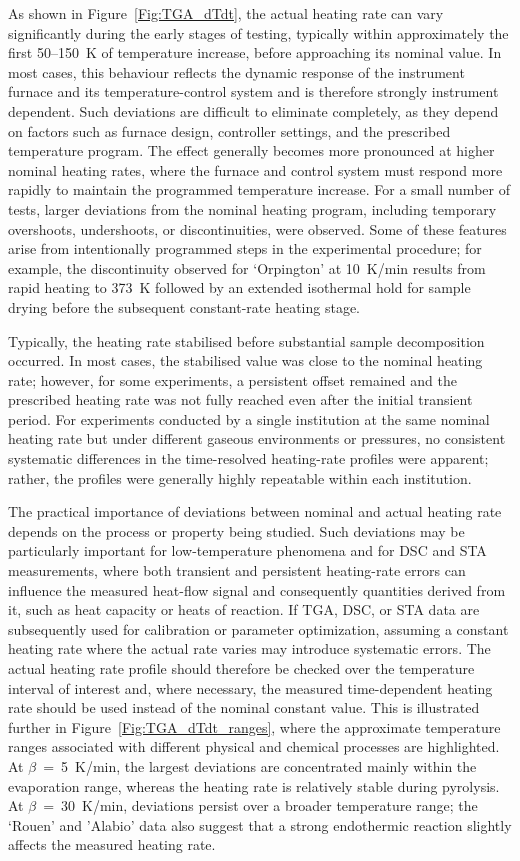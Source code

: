 \documentclass{book}
\begin{document}
As shown in Figure~\ref{Fig:TGA_dTdt}, the actual heating rate can vary significantly during the early stages of testing, typically within approximately the first 50--150~K of temperature increase, before approaching its nominal value. In most cases, this behaviour reflects the dynamic response of the instrument furnace and its temperature-control system and is therefore strongly instrument dependent. Such deviations are difficult to eliminate completely, as they depend on factors such as furnace design, controller settings, and the prescribed temperature program. The effect generally becomes more pronounced at higher nominal heating rates, where the furnace and control system must respond more rapidly to maintain the programmed temperature increase. For a small number of tests, larger deviations from the nominal heating program, including temporary overshoots, undershoots, or discontinuities, were observed. Some of these features arise from intentionally programmed steps in the experimental procedure; for example, the discontinuity observed for `Orpington' at 10~K/min results from rapid heating to 373~K followed by an extended isothermal hold for sample drying before the subsequent constant-rate heating stage.

Typically, the heating rate stabilised before substantial sample decomposition occurred. In most cases, the stabilised value was close to the nominal heating rate; however, for some experiments, a persistent offset remained and the prescribed heating rate was not fully reached even after the initial transient period.
For experiments conducted by a single institution at the same nominal heating rate but under different gaseous environments or pressures, no consistent systematic differences in the time-resolved heating-rate profiles were apparent; rather, the profiles were generally highly repeatable within each institution.

The practical importance of deviations between nominal and actual heating rate depends on the process or property being studied.
Such deviations may be particularly important for low-temperature phenomena and for DSC and STA measurements, where both transient and persistent heating-rate errors can influence the measured heat-flow signal and consequently quantities derived from it, such as heat capacity or heats of reaction.
If TGA, DSC, or STA data are subsequently used for calibration or parameter optimization, assuming a constant heating rate where the actual rate varies may introduce systematic errors. The actual heating rate profile should therefore be checked over the temperature interval of interest and, where necessary, the measured time-dependent heating rate should be used instead of the nominal constant value. This is illustrated further in Figure~\ref{Fig:TGA_dTdt_ranges}, where the approximate temperature ranges associated with different physical and chemical processes are highlighted. At $\beta$~=~5~K/min, the largest deviations are concentrated mainly within the evaporation range, whereas the heating rate is relatively stable during pyrolysis. At $\beta$~=~30~K/min, deviations persist over a broader temperature range; the `Rouen' and 'Alabio' data also suggest that a strong endothermic reaction slightly affects the measured heating rate.
\end{document}
